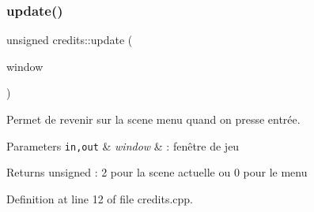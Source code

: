 \subsubsection{\texorpdfstring{update()}{update()}}
{\footnotesize\ttfamily unsigned credits\+::update (\begin{DoxyParamCaption}\item[{\hyperlink{class_min_g_l}{Min\+GL} \&}]{window }\end{DoxyParamCaption})}



Permet de revenir sur la scene menu quand on presse entrée. 


\begin{DoxyParams}[1]{Parameters}
\mbox{\tt in,out}  & {\em window} & \+: fenêtre de jeu \\
\hline
\end{DoxyParams}
\begin{DoxyReturn}{Returns}
unsigned \+: 2 pour la scene actuelle ou 0 pour le menu 
\end{DoxyReturn}


Definition at line 12 of file credits.\+cpp.

